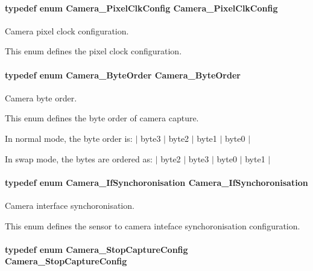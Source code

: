 \paragraph[{Camera\+\_\+\+Pixel\+Clk\+Config}]{\setlength{\rightskip}{0pt plus 5cm}typedef enum {\bf Camera\+\_\+\+Pixel\+Clk\+Config}  {\bf Camera\+\_\+\+Pixel\+Clk\+Config}}\label{_camera_8h_a844022cef41a1a6df47b87ec46f8d658}


Camera pixel clock configuration. 

This enum defines the pixel clock configuration. 
\paragraph[{Camera\+\_\+\+Byte\+Order}]{\setlength{\rightskip}{0pt plus 5cm}typedef enum {\bf Camera\+\_\+\+Byte\+Order}  {\bf Camera\+\_\+\+Byte\+Order}}\label{_camera_8h_ae04f64f1517285b35f56ac4f3ae6008f}


Camera byte order. 

This enum defines the byte order of camera capture.

In normal mode, the byte order is\+: $\vert$ byte3 $\vert$ byte2 $\vert$ byte1 $\vert$ byte0 $\vert$

In swap mode, the bytes are ordered as\+: $\vert$ byte2 $\vert$ byte3 $\vert$ byte0 $\vert$ byte1 $\vert$ 
\paragraph[{Camera\+\_\+\+If\+Synchoronisation}]{\setlength{\rightskip}{0pt plus 5cm}typedef enum {\bf Camera\+\_\+\+If\+Synchoronisation}  {\bf Camera\+\_\+\+If\+Synchoronisation}}\label{_camera_8h_af205d344ecb59e656c640241783ddf6c}


Camera interface synchoronisation. 

This enum defines the sensor to camera inteface synchoronisation configuration. 
\paragraph[{Camera\+\_\+\+Stop\+Capture\+Config}]{\setlength{\rightskip}{0pt plus 5cm}typedef enum {\bf Camera\+\_\+\+Stop\+Capture\+Config}  {\bf Camera\+\_\+\+Stop\+Capture\+Config}}\label{_camera_8h_a8b5e3682ad3dca8fd314d7a09e374a68}


